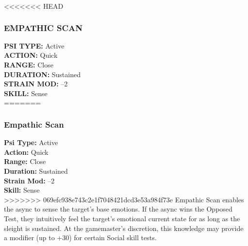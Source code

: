 <<<<<<< HEAD \subsubsection{EMPATHIC SCAN} \textbf{PSI TYPE:} Active \\ \textbf{ACTION:} Quick \\ \textbf{RANGE:} Close \\ \textbf{DURATION:} Sustained \\ \textbf{STRAIN MOD:} –2 \\ \textbf{SKILL:} Sense\\ ======= \subsubsection{Empathic Scan} \textbf{Psi Type:} Active \\ \textbf{Action:} Quick \\ \textbf{Range:} Close \\ \textbf{Duration:} Sustained \\ \textbf{Strain Mod:} –2 \\ \textbf{Skill:} Sense\\ >>>>>>> 069efc938e743c2e1f7048421dcd3e53a984f73e Empathic Scan enables the async to sense the target’s base emotions. If the async wins the Opposed Test, they intuitively feel the target’s emotional current state for as long as the sleight is sustained. At the gamemaster’s discretion, this knowledge may provide a modifier (up to +30) for certain Social skill tests. 

